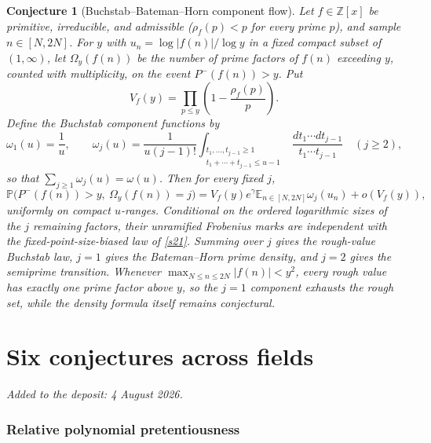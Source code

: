 \documentclass[11pt]{article}
\newtheorem{conjecture}{Conjecture}
\theoremstyle{definition}
\newcommand{\E}{\mathbb E}
\newcommand{\Pp}{\mathbb P}
\newcommand{\Z}{\mathbb Z}
\providecommand{\Z}{\mathbb Z}
\providecommand{\E}{\mathbb E}
\providecommand{\Pp}{\mathbb P}
\begin{document}
\begin{conjecture}[Buchstab--Bateman--Horn component flow]\label{s25}
Let $f\in\Z[x]$ be primitive, irreducible, and admissible ($\rho_f(p)<p$ for every prime $p$), and sample
$n\in[N,2N]$.  For $y$ with
$u_n=\log|f(n)|/\log y$ in a fixed compact subset of $(1,\infty)$, let
$\Omega_y(f(n))$ be the number of prime factors of $f(n)$ exceeding $y$, counted with
multiplicity, on the event $P^-(f(n))>y$.  Put
\[
 V_f(y)=\prod_{p\le y}\left(1-\frac{\rho_f(p)}p\right).
\]
Define the Buchstab component functions by
\[
 \omega_1(u)=\frac1u,
 \qquad
 \omega_j(u)=\frac{1}{u(j-1)!}
 \int_{\substack{t_1,\ldots,t_{j-1}\ge1\\
 t_1+\cdots+t_{j-1}\le u-1}}
 \frac{dt_1\cdots dt_{j-1}}{t_1\cdots t_{j-1}}
 \quad(j\ge2),
\]
so that $\sum_{j\ge1}\omega_j(u)=\omega(u)$.  Then for every fixed $j$,
\[
 \Pp\bigl(P^-(f(n))>y,\ \Omega_y(f(n))=j\bigr)
 =V_f(y)e^\gamma\E_{n\in[N,2N]}\omega_j(u_n)+o(V_f(y)),
\]
uniformly on compact $u$-ranges.  Conditional on the ordered logarithmic sizes of the
$j$ remaining factors, their unramified Frobenius marks are independent with the
fixed-point-size-biased law of \cref{s21}.  Summing over $j$ gives the rough-value
Buchstab law, $j=1$ gives the Bateman--Horn prime density, and $j=2$ gives the
semiprime transition.  Whenever $\max_{N\le n\le2N}|f(n)|<y^2$, every rough value has exactly one prime
factor above $y$, so the $j=1$ component exhausts the rough set, while the density
formula itself remains conjectural.
\end{conjecture}



\part{Six conjectures across fields}

\medskip\noindent\emph{Added to the deposit: 4 August 2026.}\par\medskip

\section{Relative polynomial pretentiousness}
\end{document}
